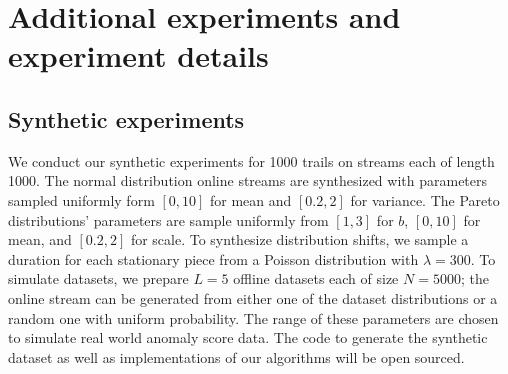 \section{Additional experiments and experiment details}
\label{app:exp1}

\subsection{Synthetic experiments}
We conduct our synthetic experiments for 1000 trails on streams each of length 1000. The normal distribution online streams are synthesized with parameters sampled uniformly form $[0, 10]$ for mean and $[0.2, 2]$ for variance. The Pareto distributions' parameters are sample uniformly from $[1,3]$ for $b$, $[0,10]$ for mean, and $[0.2,2]$ for scale. To synthesize distribution shifts, we sample a duration for each stationary piece from a Poisson distribution with $\lambda = 300$. To simulate datasets, we prepare $L=5$ offline datasets each of size $N=5000$; the online stream can be generated from either one of the dataset distributions or a random one with uniform probability. The range of these parameters are chosen to simulate real world anomaly score data. The code to generate the synthetic dataset as well as implementations of our algorithms will be open sourced.


